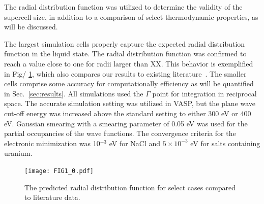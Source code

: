 \documentclass[preprint,3p,10pt,twocolumn,number,sort&compress]{elsarticle}
\begin{document}
The radial distribution function was utilized to determine the validity of the supercell size, in addition to a comparison of select thermodynamic properties, as will be discussed. 

The largest simulation cells properly capture the expected radial distribution function in the liquid state. The radial distribution function was confirmed to reach a value close to one for  radii larger than XX. This behavior is exemplified in Fig/ \ref{fig:radial}, which also compares our results to existing literature~\cite{}. The smaller cells comprise some accuracy for computationally efficiency as will be quantified in Sec.~\ref{sec:results}. All simulations used the $\Gamma$ point for integration in reciprocal space. The accurate simulation setting was utilized in VASP, but the plane wave cut-off energy was increased above the standard setting to either 300 eV or 400 eV. Gaussian smearing with a smearing parameter of 0.05 eV was used for the partial occupancies of the wave functions. The convergence criteria for the electronic minimization was 10$^{-3}$ eV for NaCl and $5\times10^{-3}$ eV for salts containing uranium. 



\begin{figure}[htb]
\centering
\texttt{[image: FIG1\_0.pdf]}
\caption{The predicted radial distribution function for select cases compared to literature data. } 
\label{fig:radial}
\end{figure}
\end{document}

